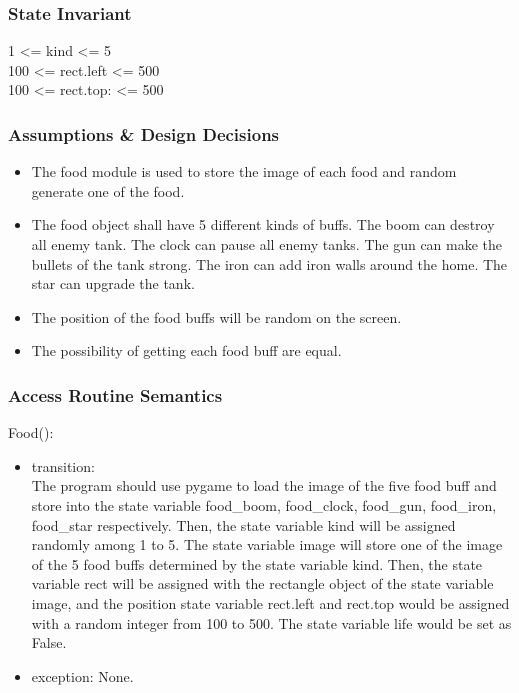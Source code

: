\documentclass[12pt, titlepage]{article}
\begin{document}
		\subsubsection{State Invariant}
		1 <= kind <= 5\\
		100 <= rect.left <= 500\\
		100 <= rect.top: <= 500
		
		\subsubsection{Assumptions \& Design Decisions}
		\begin{itemize}
		\item The food module is used to store the image of each food and random generate one of the food.
		
		\item The food object shall have 5 different kinds of buffs. The boom can destroy all enemy tank. The clock can pause all enemy tanks. The gun can make the bullets of the tank strong. The iron can add iron walls around the home. The star can upgrade the tank.
		
		\item The position of the food buffs will be random on the screen.
		
		\item The possibility of getting each food buff are equal.
		
		\end{itemize}
		\subsubsection{Access Routine Semantics}
        Food():
		\begin{itemize}
		\item transition: \\
		The program should use pygame to load the image of the five food buff and store into the state variable food\_boom, food\_clock, food\_gun, food\_iron, food\_star respectively. Then, the state variable kind will be assigned randomly among 1 to 5. The state variable image will store one of the image of the 5 food buffs determined by the state variable kind. Then, the state variable rect will be assigned with the rectangle object of the state variable image, and the position state variable rect.left and rect.top would be assigned with a random integer from 100 to 500. The state variable life would be set as False.
		
		\item exception: None.
        \end{itemize}
        
\end{document}
